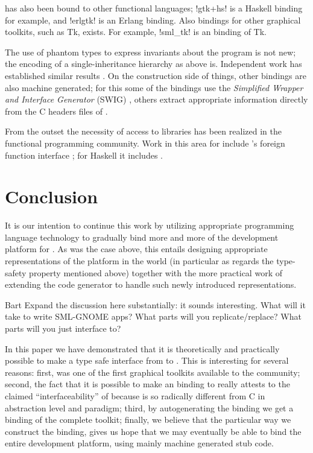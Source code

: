 \documentclass[workingdraft]{usetex-v1}
\begin{document}
\gtk has also been bound to other functional languages;
!gtk+hs! is a Haskell binding for example,
and !erlgtk! is an Erlang binding.
%
Also bindings for other graphical toolkits, such as Tk, exists.
For example, !sml_tk! is an \sml binding of Tk.

The use of phantom types to express invariants about the program
is not new; the encoding of a single-inheritance hierarchy as
above is. Independent work has established similar results
\cite{Fluet-Pucella:2002}. %
On the construction side of things, other bindings are also machine
generated; for this some of the bindings use the \emph{Simplified
  Wrapper and Interface Generator} (SWIG) \cite{Beazley:1996}, others
extract appropriate information directly from the C headers files of
\gtk.

From the outset the necessity of access to libraries has been realized
in the functional programming community. Work in this area for \sml
include 
\smlnj's foreign function interface \cite{Blume:2001:nlffi};
for Haskell it includes \cite{Finne:1999:CallingHellFromHeaven}.



\section{Conclusion}
\label{sec:conclusion}

It is our intention to continue this work by utilizing appropriate
programming language technology to gradually bind more and more of the
\gnome development platform for \sml. As was the case above, this
entails designing appropriate representations of the platform in the
\sml world (in particular as regards the type-safety property mentioned
above) together with the more practical work of extending the code
generator to handle such newly introduced representations.


\begin{ednote}{Bart}
  Expand the discussion here substantially: it sounds
interesting.  What will it take to write SML-GNOME apps?
What parts will you replicate/replace?  What parts will you
just interface to?

\end{ednote}

In this paper we have demonstrated that it is theoretically and
practically possible to make a type safe interface from \sml to \gtk.
This is interesting for several reasons: first, \mgtk was one of the
first graphical toolkits available to the \sml community; second, the
fact that it is possible to make an \sml binding to \gtk really
attests to the claimed ``interfaceability'' of \gtk because \sml is so
radically different from C in abstraction level and paradigm; third,
by autogenerating the binding we get a binding of the complete \gtk
toolkit; finally, we believe that the particular way we construct the
binding, gives us hope that we may eventually be able to bind the
entire \gnome development platform, using mainly machine generated
stub code.



\end{document}
